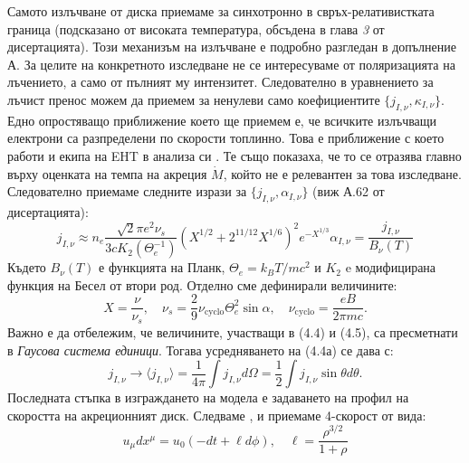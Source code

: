 \documentclass[12pt]{article}
\numberwithin{equation}{section}
\numberwithin{figure}{section}
\begin{document}
	Самото излъчване от диска приемаме за синхотронно в свръх-релативистката граница (подсказано от високата температура, обсъдена в глава \emph{3} от дисертацията). Този механизъм на излъчване е подробно разгледан в допълнение А. За целите на конкретното изследване не се интересуваме от поляризацията на лъчението, а само от пълният му интензитет. Следователно в уравнението за лъчист пренос можем да приемем за ненулеви само коефициентите $\{j_{I,\nu}, \kappa_{I,\nu}\}.$ Едно опростяващо приближение което ще приемем е, че всичките излъчващи електрони са разпределени по скорости топлинно. Това е приближение с което работи и екипа на EHT в анализа си \cite{EHT_M87_VIII}. Те също показаха, че то се отразява главно върху оценката на темпа на акреция $\dot{M}$, който не е релевантен за това изследване. Следователно приемаме следните изрази за $\{j_{I,\nu}, \alpha_{I,\nu}\}$ (виж А.62 от дисертацията):
	\begin{subequations}
		\begin{equation}
			j_{I,\nu}\approx n_e \frac{\sqrt{2}\pi e^2\nu_s}{3cK_2(\Theta_e^{-1})}\left(X^{1/2} + 2^{11/12}X^{1/6}\right)^2 e^{-X^{1/3}}
		\end{equation}
		\begin{equation}
			\alpha_{I,\nu} = \frac{j_{I,\nu}}{B_\nu(T)}
		\end{equation}
	\end{subequations}
	Където $B_\nu(T)$ е функцията на Планк, $\Theta_e = k_BT/mc^2$ и $K_2$ e модифицирана функция на Бесел от втори род. Отделно сме дефинирали величините:
	\begin{equation}
		X = \frac{\nu}{\nu_s},\quad \nu_s = \frac{2}{9}\nu_\text{cyclo}\Theta_e^2\sin\alpha, \quad \nu_\text{cyclo} = \frac{eB}{2\pi m c}.
	\end{equation}
	Важно е да отбележим, че величините, участващи в (4.4) и (4.5), са пресметнати в \emph{Гаусова система единици}. Тогава усредняването на (4.4а) се дава с:
	\begin{equation}
		j_{I,\nu}\rightarrow\langle j_{I,\nu} \rangle = \frac{1}{4\pi}\int j_{I,\nu} d\Omega = \frac{1}{2}\int j_{I,\nu} \sin\theta d\theta.
	\end{equation}
	Последната стъпка в изграждането на модела е задаването на профил на скоростта на акреционният диск. Следваме \cite{Broderick2021}, \cite{Gold2020} и приемаме 4-скорост от вида:
	\begin{equation}
		u_\mu dx^\mu = u_0(-dt + \ell d\phi),\quad \ell = \frac{\rho^{3/2}}{1 +\rho}
	\end{equation}
\end{document}
